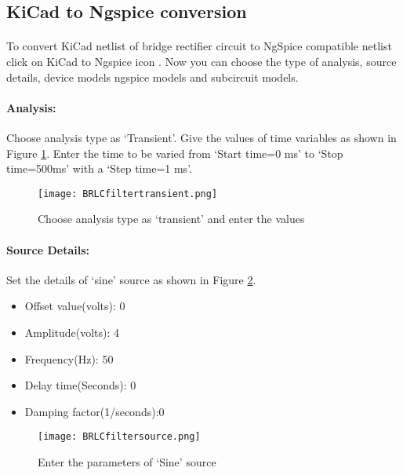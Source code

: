 \subsection*{KiCad to Ngspice conversion}

\paragraph{} To convert KiCad netlist of bridge rectifier circuit to NgSpice
compatible netlist click on KiCad to Ngspice icon .  Now you can choose the type of analysis, source details, device models ngspice models and subcircuit models.


%

\paragraph{Analysis:}Choose analysis type as `Transient'. Give the values of time variables as shown in Figure \ref{BRLCfiltertransient}. Enter the time to be varied from `Start time=0 ms' to `Stop time=500ms' with a `Step time=1 ms'.

\begin{figure}[h]
\centering
\texttt{[image: BRLCfiltertransient.png]}
\caption{Choose analysis type as `transient' and enter the values}
\label{BRLCfiltertransient}
\end{figure}

\paragraph{Source Details:} Set the details of `sine' source as shown in Figure \ref{BRLCfiltersource}.
\begin{itemize}
\item
Offset value(volts): 0
\item
Amplitude(volts): 4
\item
Frequency(Hz): 50
\item
Delay time(Seconds): 0
\item
Damping factor(1/seconds):0

\end{itemize}
\begin{figure}[h]
\centering
\texttt{[image: BRLCfiltersource.png]}
\caption{Enter the parameters of `Sine' source}
\label{BRLCfiltersource}
\end{figure}


